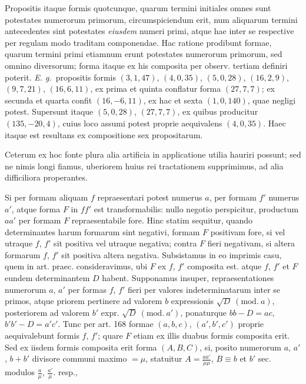 Propositis itaque formis quotcunque, quarum termini initiales omnes sunt potestates numerorum primorum, circumspiciendum erit, num aliquarum termini antecedentes sint potestates \textit{eiusdem} numeri primi, atque hae inter se respective per regulam modo traditam componendae. Hac ratione prodibunt formae, quarum termini primi etiamnum erunt potestates numerorum primorum, sed omnino diversorum; forma itaque ex his composita per observ. tertiam definiri poterit. \textit{E. g.}\ propositis formis $(3,1,47)$, $(4,0,35)$, $(5,0,28)$, $(16,2,9)$, $(9,7,21)$, $(16,6,11)$, ex prima et quinta conflatur forma $(27,7,7)$; ex secunda et quarta confit $(16,-6,11)$, ex hac et sexta $(1,0,140)$, quae negligi potest. Supersunt itaque $(5,0,28)$, $(27,7,7)$, ex quibus producitur $(135,-20,4)$, cuius loco assumi potest proprie aequivalens $(4,0,35)$. Haec itaque est resultans ex compositione sex propositarum.

Ceterum ex hoc fonte plura alia artificia in applicatione utilia hauriri possunt; sed ne nimis longi fiamus, uberiorem huius rei tractationem supprimimus, ad alia difficiliora properantes.

Si per formam aliquam $f$ repraesentari potest numerus $a$, per formam $f'$ numerus $a'$, atque forma $F$ in $ff'$ est transformabilis: nullo negotio perspicitur, productum $aa'$ per formam $F$ repraesentabile fore. Hinc statim sequitur, quando determinantes harum formarum sint negativi, formam $F$ positivam fore, si vel utraque $f$, $f'$ sit positiva vel utraque negativa; contra $F$ fieri negativam, si altera formarum $f$, $f'$ sit positiva altera negativa. Subsistamus in eo imprimis casu, quem in art. praec. consideravimus, ubi $F$ ex $f$, $f'$ composita est. atque $f$, $f'$ et $F$ eundem determinantem $D$ habent. Supponamus insuper, repraesentationes numerorum $a$, $a'$ per formas $f$, $f'$ fieri per valores indeterminatarum inter se primos, atque priorem pertinere ad valorem $b$ expressionis $\surd D\ (\mathrm{mod.}\ a)$, posteriorem ad valorem $b'$ expr. $\surd D\ (\mathrm{mod.}\ a')$, ponaturque $bb-D=ac$, $b'b'-D=a'c'$. Tunc per art. 168 formae $(a,b,c)$, $(a',b',c')$ proprie aequivalebunt formis $f$, $f'$; quare $F$ etiam ex illis duabus formis composita erit. Sed ex iisdem formis composita erit forma $(A,B,C)$, si, posito numerorum $a$, $a'$, $b+b'$ divisore communi maximo $=\mu$, statuitur $A=\frac{aa'}{\mu\mu}$, $B\equiv b$ et $b'$ sec. modulos $\frac{a}{\mu}$, $\frac{a'}{\mu}$. resp.,
